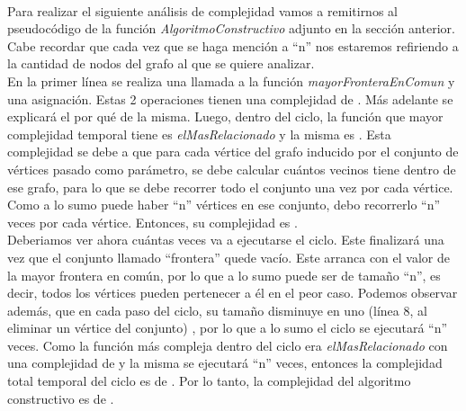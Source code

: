 \paragraph{}
Para realizar el siguiente análisis de complejidad vamos a remitirnos al pseudocódigo de la función \textit{AlgoritmoConstructivo} adjunto en la sección anterior. Cabe recordar que cada vez que se haga mención a ``n'' nos estaremos refiriendo a la cantidad de nodos del grafo al que se quiere analizar.\\
En la primer línea se realiza una llamada a la función \textit{mayorFronteraEnComun} y una asignación. Estas 2 operaciones tienen una complejidad de . Más adelante se explicará el por qué de la misma. Luego, dentro del ciclo, la función que mayor complejidad temporal tiene es \textit{elMasRelacionado} y la misma es . Esta complejidad se debe a que para cada vértice del grafo inducido por el conjunto de vértices pasado como parámetro, se debe calcular cuántos vecinos tiene dentro de ese grafo, para lo que se debe recorrer todo el conjunto una vez por cada vértice. Como a lo sumo puede haber ``n'' vértices en ese conjunto, debo recorrerlo ``n'' veces por cada vértice. Entonces, su complejidad es .\\
Deberiamos ver ahora cuántas veces va a ejecutarse el ciclo. Este finalizará una vez que el conjunto llamado ``frontera'' quede vacío. Este arranca con el valor de la mayor frontera en común, por lo que a lo sumo puede ser de tamaño ``n'', es decir, todos los vértices pueden pertenecer a él en el peor caso. Podemos observar además, que en cada paso del ciclo, su tamaño disminuye en uno (línea 8, al eliminar un vértice del conjunto) , por lo que a lo sumo el ciclo se ejecutará ``n'' veces. Como la función más compleja dentro del ciclo era \textit{elMasRelacionado} con una complejidad de  y la misma se ejecutará ``n'' veces, entonces la complejidad total temporal del ciclo es de . Por lo tanto, la complejidad del algoritmo constructivo es de .

